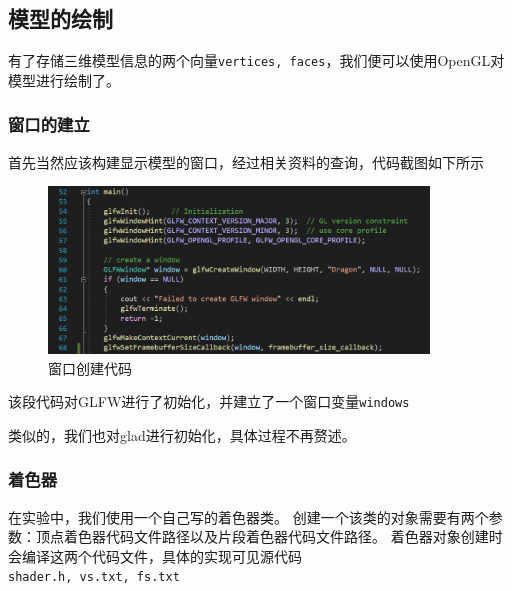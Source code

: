 \documentclass[UTF8]{ctexart}
\begin{document}
\subsection{模型的绘制}
\par
有了存储三维模型信息的两个向量\verb|vertices, faces|，我们便可以使用OpenGL对模型进行绘制了。

\subsubsection{窗口的建立}
\par
首先当然应该构建显示模型的窗口，经过相关资料的查询，代码截图如下所示
\begin{figure}[h]
	\centering
	\includegraphics*[width=0.9\textwidth]{1.png}
	\caption{窗口创建代码}
	\label{fig:1}
\end{figure}
\par
该段代码对GLFW进行了初始化，并建立了一个窗口变量\verb|windows|
\par
类似的，我们也对glad进行初始化，具体过程不再赘述。

\subsubsection{着色器}
\par
在实验中，我们使用一个自己写的着色器类。
创建一个该类的对象需要有两个参数：顶点着色器代码文件路径以及片段着色器代码文件路径。
着色器对象创建时会编译这两个代码文件，具体的实现可见源代码
\\\verb|shader.h, vs.txt, fs.txt|
\end{document}
